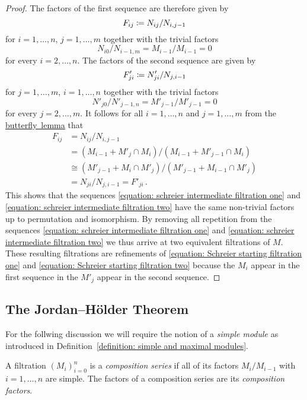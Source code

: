 \begin{proof}
  The factors of the first sequence are therefore given by
  \[
              F_{ij}
    \coloneqq  N_{ij}/N_{i,j-1}
  \]
  for $i = 1, \dotsc, n$, $j = 1, \dotsc, m$ together with the trivial factors
  \[
      N_{i0}/N_{i-1,m}
    = M_{i-1}/M_{i-1}
    = 0
  \]
  for every $i = 2, \dotsc, n$.
  The factors of the second sequence are given by
  \[
              F'_{ji}
    \coloneqq  N'_{ji}/N_{j,i-1}
  \]
  for $j = 1, \dotsc, m$, $i = 1, \dotsc, n$ together with the trivial factors
  \[
      N'_{j0}/N'_{j-1,n}
    = M'_{j-1}/M'_{j-1}
    = 0
  \]
  for every $j = 2, \dotsc, m$.
  It follows for all $i = 1, \dotsc, n$ and $j = 1, \dotsc, m$ from the \hyperref[lemma: butterfly lemma]{butterfly~lemma} that
  \begin{align*}
            F_{ij}
    &=      N_{ij}/N_{i,j-1}  \\
    &=      (M_{i-1} + M'_j \cap M_i)/(M_{i-1} + M'_{j-1} \cap M_i)   \\
    &\cong  (M'_{j-1} + M_i \cap M'_j)/(M'_{j-1} + M_{i-1} \cap M'_j) \\
    &=      N_{ji}/N_{j,i-1}
     =      F'_{ji} \,.
  \end{align*}
  This shows that the sequences \eqref{equation: schreier intermediate filtration one} and \eqref{equation: schreier intermediate filtration two} have the same non-trivial factors up to permutation and isomorphism.
  By removing all repetition from the sequences \eqref{equation: schreier intermediate filtration one} and \eqref{equation: schreier intermediate filtration two} we thus arrive at two equivalent filtrations of $M$.
  These resulting filtrations are refinements of \eqref{equation: Schreier starting filtration one} and \eqref{equation: Schreier starting filtration two} because the $M_i$ appear in the first sequence in the $M'_j$ appear in the second sequence.
\end{proof}





\subsection{The Jordan--Hölder Theorem}


\begin{fluff}
  For the follwing discussion we will require the notion of a \emph{simple module} as introduced in Definition~\ref{definition: simple and maximal modules}.
\end{fluff}


\begin{definition}
  \label{definition: composition series}
  A filtration $(M_i)_{i=0}^n$ is a \emph{composition series} if all of its factors $M_i/M_{i-1}$ with $i = 1, \dotsc, n$ are simple.
  The factors of a composition series are its \emph{composition factors}.
\end{definition}


